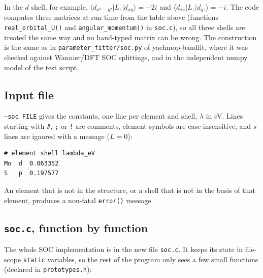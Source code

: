 \documentclass[11pt,a4paper]{article}
\newcommand{\file}[1]{\texttt{#1}}
\newcommand{\fn}[1]{\texttt{#1()}}
\newcommand{\opt}[1]{\texttt{#1}}
\begin{document}
In the $d$ shell, for example, $\langle d_{x^2-y^2}|L_z|d_{xy}\rangle=-2i$ and
$\langle d_{xz}|L_z|d_{yz}\rangle=-i$. The code computes these matrices at run time from
the table above (functions \fn{real\_orbital\_U} and \fn{angular\_momentum} in
\file{soc.c}), so all three shells are treated the same way and no hand-typed matrix can be
wrong. The construction is the same as in \file{parameter\_fitter/soc.py} of
yaehmop-bandfit, where it was checked against Wannier/DFT SOC splittings, and in the
independent numpy model of the test script.

\subsection{Input file}

\opt{--soc FILE} gives the constants, one line per element and shell, $\lambda$ in eV.
Lines starting with \texttt{\#}, \texttt{;} or \texttt{!} are comments, element symbols are
case-insensitive, and $s$ lines are ignored with a message ($L=0$):
\begin{lstlisting}[style=sh]
# element shell lambda_eV
Mo  d  0.063352
S   p  0.197577
\end{lstlisting}
An element that is not in the structure, or a shell that is not in the basis of that
element, produces a non-fatal \fn{error} message.

\subsection{\file{soc.c}, function by function}

The whole SOC implementation is in the new file \file{soc.c}. It keeps its state in
file-scope \texttt{static} variables, so the rest of the program only sees a few small
functions (declared in \file{prototypes.h}):
\end{document}
